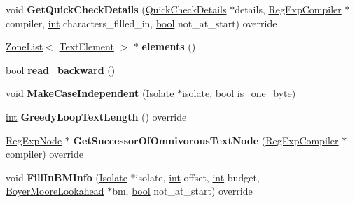 \begin{DoxyCompactItemize}
void {\bfseries Get\+Quick\+Check\+Details} (\mbox{\hyperlink{classv8_1_1internal_1_1QuickCheckDetails}{Quick\+Check\+Details}} $\ast$details, \mbox{\hyperlink{classv8_1_1internal_1_1RegExpCompiler}{Reg\+Exp\+Compiler}} $\ast$compiler, \mbox{\hyperlink{classint}{int}} characters\+\_\+filled\+\_\+in, \mbox{\hyperlink{classbool}{bool}} not\+\_\+at\+\_\+start) override
\item 
\mbox{\label{classv8_1_1internal_1_1TextNode_adaf2c35d3b69231b4bbb700f87ff0eb4}} 
\mbox{\hyperlink{classv8_1_1internal_1_1ZoneList}{Zone\+List}}$<$ \mbox{\hyperlink{classv8_1_1internal_1_1TextElement}{Text\+Element}} $>$ $\ast$ {\bfseries elements} ()
\item 
\mbox{\label{classv8_1_1internal_1_1TextNode_ab4c9edf867bef53a95e33253d04468ac}} 
\mbox{\hyperlink{classbool}{bool}} {\bfseries read\+\_\+backward} ()
\item 
\mbox{\label{classv8_1_1internal_1_1TextNode_ab554495b2be955377b56b8f11cdd33db}} 
void {\bfseries Make\+Case\+Independent} (\mbox{\hyperlink{classv8_1_1internal_1_1Isolate}{Isolate}} $\ast$isolate, \mbox{\hyperlink{classbool}{bool}} is\+\_\+one\+\_\+byte)
\item 
\mbox{\label{classv8_1_1internal_1_1TextNode_a71027af872adea3e6a46d1442854f7f5}} 
\mbox{\hyperlink{classint}{int}} {\bfseries Greedy\+Loop\+Text\+Length} () override
\item 
\mbox{\label{classv8_1_1internal_1_1TextNode_a30c819737608f81a3a450d992be18b9d}} 
\mbox{\hyperlink{classv8_1_1internal_1_1RegExpNode}{Reg\+Exp\+Node}} $\ast$ {\bfseries Get\+Successor\+Of\+Omnivorous\+Text\+Node} (\mbox{\hyperlink{classv8_1_1internal_1_1RegExpCompiler}{Reg\+Exp\+Compiler}} $\ast$compiler) override
\item 
\mbox{\label{classv8_1_1internal_1_1TextNode_acfbc8ff9972cd1e9ffb95c25b8778824}} 
void {\bfseries Fill\+In\+B\+M\+Info} (\mbox{\hyperlink{classv8_1_1internal_1_1Isolate}{Isolate}} $\ast$isolate, \mbox{\hyperlink{classint}{int}} offset, \mbox{\hyperlink{classint}{int}} budget, \mbox{\hyperlink{classv8_1_1internal_1_1BoyerMooreLookahead}{Boyer\+Moore\+Lookahead}} $\ast$bm, \mbox{\hyperlink{classbool}{bool}} not\+\_\+at\+\_\+start) override

\end{DoxyCompactItemize}
